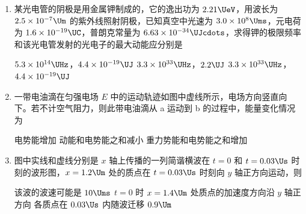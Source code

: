 \documentclass[\gkver]{gaokaozhenti}
\begin{document}
\begin{enumerate}

\item
某光电管的阴极是用金属钾制成的，它的逸出功为 $2.21\UeV$，用波长为 $2.5\times10^{-7}\Um$ 的紫外线照射阴极，已知真空中光速为 $3.0\times10^{8}\Ums$，元电荷为 $1.6\times10^{-19}\UC$，普朗克常量为 $6.63\times10^{-34}\UJcdots$，求得钾的极限频率和该光电管发射的光电子的最大动能应分别是

{$5.3\times10^{14}\UHz$，$4.4\times10^{-19}\UJ$}
{$3.3\times10^{33}\UHz$，$2.2\UJ$}
{$3.3\times10^{33}\UHz$，$4.4\times10^{-19}\UJ$}


\item
一带电油滴在匀强电场 $E$ 中的运动轨迹如图中虚线所示，电场方向竖直向下。若不计空气阻力，则此带电油滴从 a 运动到 b 的过程中，能量变化情况为


{电势能增加}
{动能和电势能之和减小}
{重力势能和电势能之和增加}


\item
图中实线和虚线分别是 $x$ 轴上传播的一列简谐横波在 $t=0$ 和 $t=0.03\Us$ 时刻的波形图，$x=1.2\Um$ 处的质点在 $t=0.03\Us$ 时刻向 $y$ 轴正方向运动，则


{该波的波速可能是 $10\Ums$}
{$t=0$ 时 $x=1.4\Um$ 处质点的加速度方向沿 $y$ 轴正方向}
{各质点在 $0.03\Us$ 内随波迁移 $0.9\Um$}



\end{enumerate}
\end{document}
